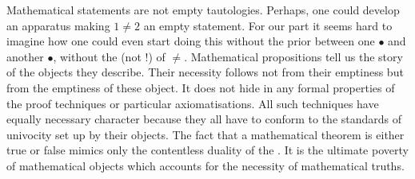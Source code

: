 Mathematical statements are not empty tautologies.  Perhaps,
one could develop an apparatus making $1\not = 2$ an empty statement.  For our
part it seems hard to imagine how one could even start doing this without the
prior  between one $\bullet$ and another $\bullet$, without the
 (not !) of $\not =$.  Mathematical
propositions tell us the story of the objects they describe.  Their necessity
follows not from their emptiness but from the emptiness of these object.  It
does not hide in any formal properties of the proof techniques or particular
axiomatisations.  All such techniques have equally necessary character because
they all have to conform to the standards of  univocity set up by
their objects.  The fact that a mathematical theorem is either true or false
mimics only the contentless duality of the . It is the ultimate poverty of mathematical objects which
accounts for the necessity of mathematical truths.


